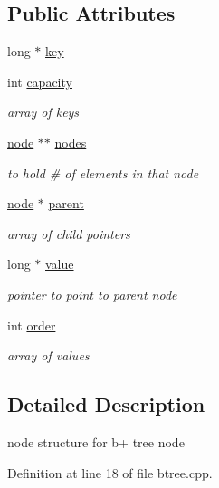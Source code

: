\subsection*{Public Attributes}
\begin{DoxyCompactItemize}
\item 
long $\ast$ \hyperlink{class_btree_1_1node_aa1da48fc5e2b8203ae262525c480befa}{key}
\item 
int \hyperlink{class_btree_1_1node_ac42856b830b60d8f60d6c726964b1ec3}{capacity}
\begin{DoxyCompactList}\small\item\em array of keys \end{DoxyCompactList}\item 
\hyperlink{class_btree_1_1node}{node} $\ast$$\ast$ \hyperlink{class_btree_1_1node_a289484989ca45bfb92c18040556b42f8}{nodes}
\begin{DoxyCompactList}\small\item\em to hold \# of elements in that node \end{DoxyCompactList}\item 
\hyperlink{class_btree_1_1node}{node} $\ast$ \hyperlink{class_btree_1_1node_a0e7ad88a4ae04f8750d3590783cda080}{parent}
\begin{DoxyCompactList}\small\item\em array of child pointers \end{DoxyCompactList}\item 
long $\ast$ \hyperlink{class_btree_1_1node_ac38e10b3743673fa9f8ff9b6551d64ba}{value}
\begin{DoxyCompactList}\small\item\em pointer to point to parent node \end{DoxyCompactList}\item 
int \hyperlink{class_btree_1_1node_a8a5ff91fd8e251549f3e2c70c04765b7}{order}
\begin{DoxyCompactList}\small\item\em array of values \end{DoxyCompactList}\end{DoxyCompactItemize}


\subsection{Detailed Description}
node structure for b+ tree node 

Definition at line 18 of file btree.\-cpp.



